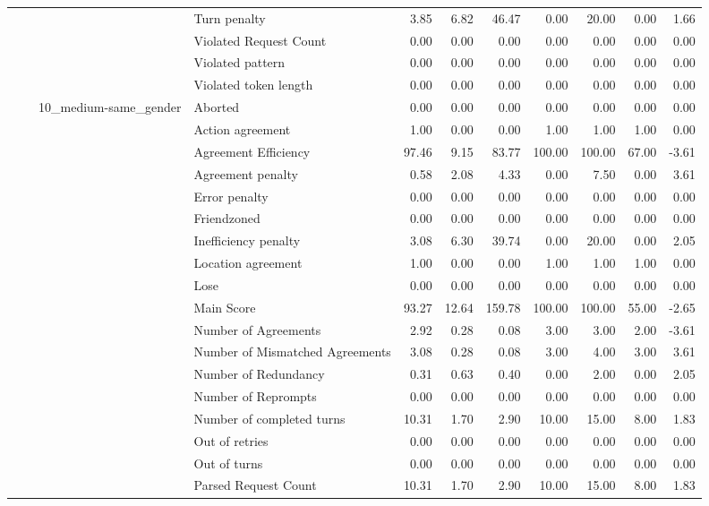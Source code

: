 \begin{tabular}{llllrrrrrrr}
 &  &  & Turn penalty & 3.85 & 6.82 & 46.47 & 0.00 & 20.00 & 0.00 & 1.66 \\
 &  &  & Violated Request Count & 0.00 & 0.00 & 0.00 & 0.00 & 0.00 & 0.00 & 0.00 \\
 &  &  & Violated pattern & 0.00 & 0.00 & 0.00 & 0.00 & 0.00 & 0.00 & 0.00 \\
 &  &  & Violated token length & 0.00 & 0.00 & 0.00 & 0.00 & 0.00 & 0.00 & 0.00 \\
\cline{3-11}
 &  & \multirow[t]{27}{*}{10_medium-same_gender} & Aborted & 0.00 & 0.00 & 0.00 & 0.00 & 0.00 & 0.00 & 0.00 \\
 &  &  & Action agreement & 1.00 & 0.00 & 0.00 & 1.00 & 1.00 & 1.00 & 0.00 \\
 &  &  & Agreement Efficiency & 97.46 & 9.15 & 83.77 & 100.00 & 100.00 & 67.00 & -3.61 \\
 &  &  & Agreement penalty & 0.58 & 2.08 & 4.33 & 0.00 & 7.50 & 0.00 & 3.61 \\
 &  &  & Error penalty & 0.00 & 0.00 & 0.00 & 0.00 & 0.00 & 0.00 & 0.00 \\
 &  &  & Friendzoned & 0.00 & 0.00 & 0.00 & 0.00 & 0.00 & 0.00 & 0.00 \\
 &  &  & Inefficiency penalty & 3.08 & 6.30 & 39.74 & 0.00 & 20.00 & 0.00 & 2.05 \\
 &  &  & Location agreement & 1.00 & 0.00 & 0.00 & 1.00 & 1.00 & 1.00 & 0.00 \\
 &  &  & Lose & 0.00 & 0.00 & 0.00 & 0.00 & 0.00 & 0.00 & 0.00 \\
 &  &  & Main Score & 93.27 & 12.64 & 159.78 & 100.00 & 100.00 & 55.00 & -2.65 \\
 &  &  & Number of Agreements & 2.92 & 0.28 & 0.08 & 3.00 & 3.00 & 2.00 & -3.61 \\
 &  &  & Number of Mismatched Agreements & 3.08 & 0.28 & 0.08 & 3.00 & 4.00 & 3.00 & 3.61 \\
 &  &  & Number of Redundancy & 0.31 & 0.63 & 0.40 & 0.00 & 2.00 & 0.00 & 2.05 \\
 &  &  & Number of Reprompts & 0.00 & 0.00 & 0.00 & 0.00 & 0.00 & 0.00 & 0.00 \\
 &  &  & Number of completed turns & 10.31 & 1.70 & 2.90 & 10.00 & 15.00 & 8.00 & 1.83 \\
 &  &  & Out of retries & 0.00 & 0.00 & 0.00 & 0.00 & 0.00 & 0.00 & 0.00 \\
 &  &  & Out of turns & 0.00 & 0.00 & 0.00 & 0.00 & 0.00 & 0.00 & 0.00 \\
 &  &  & Parsed Request Count & 10.31 & 1.70 & 2.90 & 10.00 & 15.00 & 8.00 & 1.83 \\

\end{tabular}
